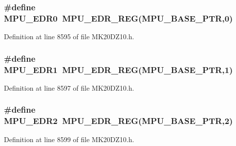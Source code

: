 \subsubsection[{\texorpdfstring{M\+P\+U\+\_\+\+E\+D\+R0}{MPU_EDR0}}]{\setlength{\rightskip}{0pt plus 5cm}\#define M\+P\+U\+\_\+\+E\+D\+R0~{\bf M\+P\+U\+\_\+\+E\+D\+R\+\_\+\+R\+EG}({\bf M\+P\+U\+\_\+\+B\+A\+S\+E\+\_\+\+P\+TR},0)}\hypertarget{group___m_p_u___register___accessor___macros_ga763fe9247b44b10ee381600ba111bc1a}{}\label{group___m_p_u___register___accessor___macros_ga763fe9247b44b10ee381600ba111bc1a}


Definition at line 8595 of file M\+K20\+D\+Z10.\+h.

\subsubsection[{\texorpdfstring{M\+P\+U\+\_\+\+E\+D\+R1}{MPU_EDR1}}]{\setlength{\rightskip}{0pt plus 5cm}\#define M\+P\+U\+\_\+\+E\+D\+R1~{\bf M\+P\+U\+\_\+\+E\+D\+R\+\_\+\+R\+EG}({\bf M\+P\+U\+\_\+\+B\+A\+S\+E\+\_\+\+P\+TR},1)}\hypertarget{group___m_p_u___register___accessor___macros_ga69a87c7cb4c5d849e48f6883817c7bce}{}\label{group___m_p_u___register___accessor___macros_ga69a87c7cb4c5d849e48f6883817c7bce}


Definition at line 8597 of file M\+K20\+D\+Z10.\+h.

\subsubsection[{\texorpdfstring{M\+P\+U\+\_\+\+E\+D\+R2}{MPU_EDR2}}]{\setlength{\rightskip}{0pt plus 5cm}\#define M\+P\+U\+\_\+\+E\+D\+R2~{\bf M\+P\+U\+\_\+\+E\+D\+R\+\_\+\+R\+EG}({\bf M\+P\+U\+\_\+\+B\+A\+S\+E\+\_\+\+P\+TR},2)}\hypertarget{group___m_p_u___register___accessor___macros_ga549fbce9060675a6695c3725bf945814}{}\label{group___m_p_u___register___accessor___macros_ga549fbce9060675a6695c3725bf945814}


Definition at line 8599 of file M\+K20\+D\+Z10.\+h.

